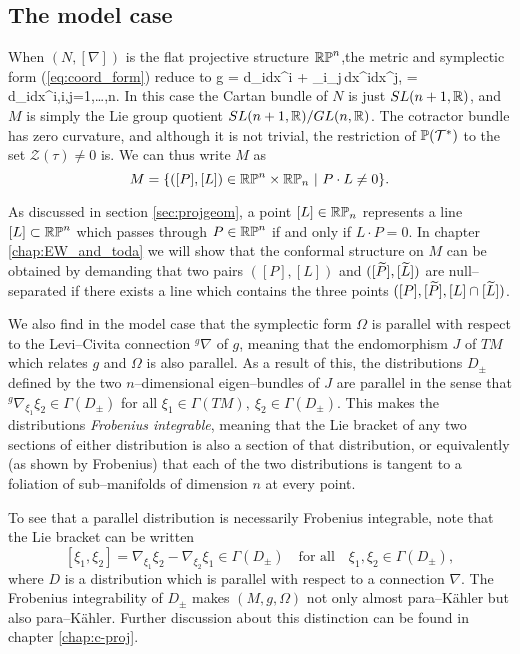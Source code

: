 \subsection{The model case} \label{sec:intro_model}
When $(N,[\nabla])$ is the flat projective structure $\mathbb{RP}^n$,the metric and symplectic form (\ref{eq:coord_form}) reduce to
\be \label{eq:intro_model_g}
g = d\zeta_i\odot dx^i + \zeta_i\zeta_j\,dx^i\odot dx^j, \quad \Omega = d\zeta_i\wedge dx^i,\quad i,j=1,\dots,n.
\ee
In this case the Cartan bundle of $N$ is just $SL(n+1,\mathbb{R})$, and $M$ is simply the Lie group quotient $SL(n+1,\mathbb{R})/GL(n,\mathbb{R})$. The cotractor bundle has zero curvature, and although it is not trivial, the restriction of $\mathbb{P}(\mathcal{T}^*)$ to the set $\mathcal{Z}(\tau)\neq 0$ is. %
We can thus write $M$ as
\[
M=\{([P],[L])\in\RP^n\times\RP_n\ |\ P\cdot L\neq 0\}.
\]

As discussed in section \ref{sec:projgeom}, a point $[L]\in\mathbb{RP}_n$ represents a line $[L]\subset\mathbb{RP}^n$ which passes through $P\in\mathbb{RP}^n$ if and only if $L\cdot P=0$. In chapter \ref{chap:EW_and_toda} we will show that the conformal structure on $M$ can be obtained by demanding that two pairs $([P], [L])$ and $([\widetilde{P}], [\widetilde{L}])$ are null--separated if there exists a line which contains the three points $([P], [\widetilde{P}], [L]\cap [\widetilde{L}])$.

We also find in the model case that the symplectic form $\Omega$ is parallel with respect to the Levi--Civita connection $^g\nabla$ of $g$, meaning that the endomorphism $J$ of $TM$ which relates $g$ and $\Omega$ is also parallel. As a result of this, the distributions $D_\pm$ defined by the two $n$--dimensional eigen--bundles of $J$ are parallel in the sense that $^g\nabla_{\xi_1}\xi_2\in\Gamma(D_\pm)$ for all $\xi_1\in \Gamma(TM),\ \xi_2\in\Gamma(D_\pm)$. This makes the distributions \textit{Frobenius integrable}, meaning that the Lie bracket of any two sections of either distribution is also a section of that distribution, or equivalently (as shown by Frobenius) that each of the two distributions is tangent to a foliation of sub--manifolds of dimension $n$ at every point.

To see that a parallel distribution is necessarily Frobenius integrable, note that the Lie bracket can be written
\[
[\xi_1,\xi_2]= \nabla_{\xi_1}\xi_2- \nabla_{\xi_2}\xi_1\in\Gamma(D_\pm)\quad\mbox{for all}\quad \xi_1,\xi_2\in\Gamma(D_\pm),
\]
where $D$ is a distribution which is parallel with respect to a connection $\nabla$. The Frobenius integrability of $D_\pm$ makes $(M,g,\Omega)$ not only almost para--K\"ahler but also para--K\"ahler. Further discussion about this distinction can be found in chapter \ref{chap:c-proj}.